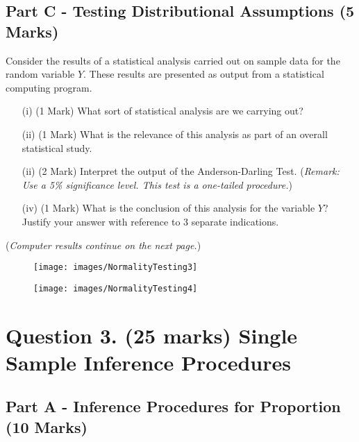\documentclass[a4paper,12pt]{article}
\begin{document}
\subsection*{Part C - Testing Distributional Assumptions (5 Marks)}
Consider the results of a statistical analysis carried out on sample data for the random variable $Y$. These results are presented as output from a statistical computing program.

\begin{itemize}
	\item[(i)] (1 Mark) What sort of statistical analysis are we carrying out? 
	\item[(ii)] (1 Mark) What is the relevance of this analysis as part of an overall statistical study.
	\item[(ii)] (2 Mark) Interpret the output of the Anderson-Darling Test. (\textit{Remark: Use a 5\% significance level. This test is a one-tailed procedure.})
	\item[(iv)] (1 Mark) What is the conclusion of this analysis for the variable $Y$? Justify your answer with reference to 3 separate indications. 
	
\end{itemize}
\noindent (\textit{Computer results continue on the next page.})

\begin{figure}[h!]
	\centering
	\texttt{[image: images/NormalityTesting3]}
\end{figure}
\begin{figure}[h!]
	\centering
	\texttt{[image: images/NormalityTesting4]}
\end{figure}

\newpage




\section*{Question 3. (25 marks) Single Sample Inference Procedures }

\subsection*{Part A - Inference Procedures for Proportion (10 Marks)}
\end{document}
